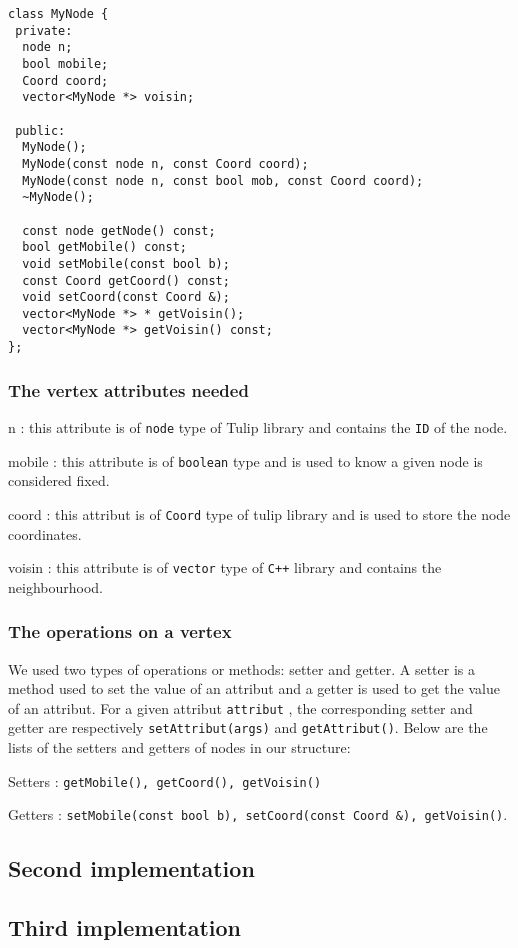 \newpage
\begin{lstlisting}
class MyNode {
 private:
  node n;
  bool mobile;
  Coord coord;  
  vector<MyNode *> voisin;

 public:
  MyNode();
  MyNode(const node n, const Coord coord);
  MyNode(const node n, const bool mob, const Coord coord);
  ~MyNode();
  
  const node getNode() const;
  bool getMobile() const;
  void setMobile(const bool b);
  const Coord getCoord() const;
  void setCoord(const Coord &);
  vector<MyNode *> * getVoisin();
  vector<MyNode *> getVoisin() const;
};
\end{lstlisting}

\subsubsection{The vertex attributes needed}
\begin{dinglist}{70}
\item[n]: this attribute is of \texttt{node} type of \textsf{Tulip} library and contains the \texttt{ID} of the node.  
\item[mobile]: this attribute is of \texttt{boolean} type and is used to know a given node is considered fixed.
\item[coord]: this attribut is of \texttt{Coord} type of \textsf{tulip} library and is used to store the node coordinates. 
\item[voisin]: this attribute is of \texttt{vector} type of \texttt{C++} library and contains the neighbourhood.
\end{dinglist}

\subsubsection{The operations on a vertex}
We used two types of operations or methods: \textsf{setter} and
\textsf{getter}. A \textsf{setter} is a method used to set the value
of an attribut and a \textsf{getter} is used to get the value of an
attribut. For a given attribut \texttt{attribut} , the corresponding
setter and getter are respectively \verb+setAttribut(args)+ and \verb+getAttribut()+. Below are the lists of the setters and getters of nodes in our structure:
\begin{dinglist}{70}
\item[Setters]: \verb+getMobile(), getCoord(), getVoisin()+  
\item[Getters]: \verb+setMobile(const bool b), setCoord(const Coord &), getVoisin()+.
\end{dinglist}

\subsection{Second implementation}
\subsection{Third implementation}
\newpage
